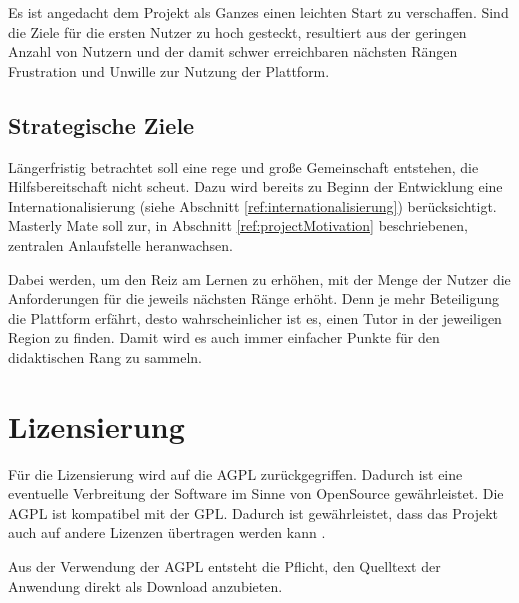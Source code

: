 Es ist angedacht dem Projekt als Ganzes einen leichten Start zu verschaffen.
Sind die Ziele für die ersten Nutzer zu hoch gesteckt, resultiert aus der
geringen Anzahl von Nutzern und der damit schwer erreichbaren nächsten Rängen
Frustration und Unwille zur Nutzung der Plattform.

\subsection{Strategische Ziele}
Längerfristig betrachtet soll eine rege und große Gemeinschaft entstehen, die
Hilfsbereitschaft nicht scheut. Dazu wird bereits zu Beginn der Entwicklung eine
Internationalisierung (siehe Abschnitt \ref{ref:internationalisierung})
berücksichtigt. Masterly Mate soll zur, in Abschnitt \ref{ref:projectMotivation}
beschriebenen, zentralen Anlaufstelle heranwachsen.

Dabei werden, um den Reiz am Lernen zu erhöhen, mit der Menge der Nutzer die
Anforderungen für die jeweils nächsten Ränge erhöht. Denn je mehr Beteiligung
die Plattform erfährt, desto wahrscheinlicher ist es, einen Tutor in der
jeweiligen Region zu finden. Damit wird es auch immer einfacher Punkte für den
didaktischen Rang zu sammeln.

\section{Lizensierung}
Für die Lizensierung wird auf die \ac{AGPL} zurückgegriffen. Dadurch ist eine
eventuelle Verbreitung der Software im Sinne von OpenSource gewährleistet. Die
AGPL ist kompatibel mit der \ac{GPL}. Dadurch ist gewährleistet, dass das
Projekt auch auf andere Lizenzen übertragen werden kann \cite{fsf:2007}.

Aus der Verwendung der AGPL entsteht die Pflicht, den Quelltext der Anwendung
direkt als Download anzubieten.

